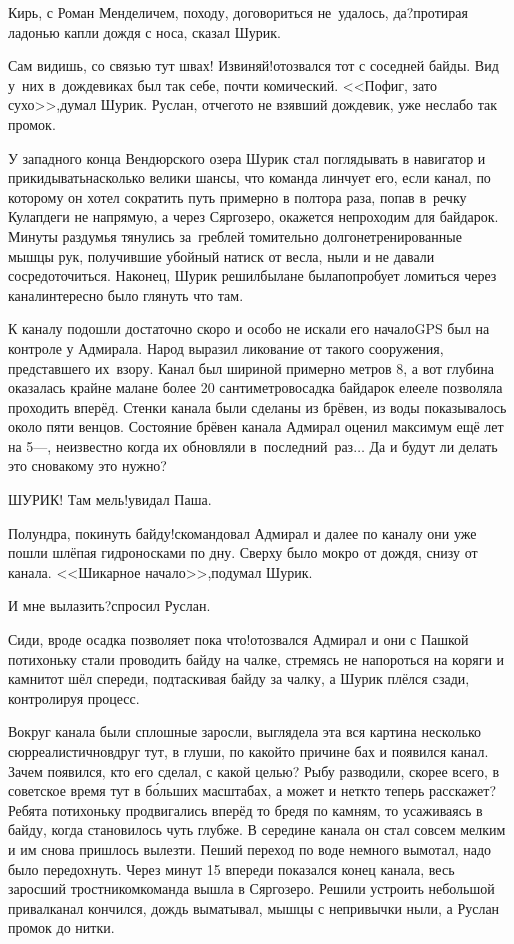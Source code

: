 \diagdash Кирь, с Роман Менделичем, походу, договориться не~удалось, да?\mdash протирая ладонью капли дождя с носа, сказал Шурик.

\diagdash Сам видишь, со связью тут швах! Извиняй!\mdash отозвался тот с соседней байды. Вид у~них в~дождевиках был так себе, почти комический. <<Пофиг, зато сухо>>,\mdash думал Шурик. Руслан, отчего\sdash то не взявший дождевик, уже неслабо так промок.

У западного конца Вендюрского озера Шурик стал поглядывать в навигатор и прикидывать\mdash насколько велики шансы, что команда линчует его, если канал, по которому он хотел сократить путь примерно в полтора раза, попав в~речку Кулапдеги не напрямую, а через Сяргозеро, окажется непроходим для байдарок. Минуты раздумья тянулись за~греблей томительно долго\mdash нетренированные мышцы рук, получившие убойный натиск от весла, ныли и не давали сосредоточиться. Наконец, Шурик решил\mdash была\sdash не была\mdash попробует ломиться через канал\mdash интересно было глянуть что там.

К каналу подошли достаточно скоро и особо не искали его начало\mdash GPS был на контроле у Адмирала. Народ выразил ликование от такого сооружения, представшего их~взору. Канал был шириной примерно метров 8, а вот глубина оказалась крайне мала\mdash не более 20 сантиметров\mdash осадка байдарок еле\sdash еле позволяла проходить вперёд. Стенки канала были сделаны из брёвен, из воды показывалось около пяти венцов. Состояние брёвен канала Адмирал оценил максимум ещё лет на 5\thinspace\nobreakdash---, неизвестно когда их обновляли в~последний~раз$\ldots$ Да и будут ли делать это снова\mdash кому это нужно?

\diagdash ШУРИК! Там мель!\mdash увидал Паша. 

\diagdash Полундра, покинуть байду!\mdash скомандовал Адмирал и далее по каналу они уже пошли шлёпая гидроносками по дну. Сверху было мокро от дождя, снизу от канала. <<Шикарное начало>>,\mdash подумал Шурик.

\diagdash И мне вылазить?\mdash спросил Руслан. 

\diagdash Сиди, вроде осадка позволяет пока что!\mdash отозвался Адмирал и они с Пашкой потихоньку стали проводить байду на чалке, стремясь не напороться на коряги и камни\mdash тот шёл спереди, подтаскивая байду за чалку, а Шурик плёлся сзади, контролируя процесс.

Вокруг канала были сплошные заросли, выглядела эта вся картина несколько сюрреалистично\mdash вдруг тут, в глуши, по какой\sdash то причине бах и появился канал. Зачем появился, кто его сделал, с какой целью? Рыбу разводили, скорее всего, в советское время тут в б\'{о}льших масштабах, а может и нет\mdash кто теперь расскажет? Ребята потихоньку продвигались вперёд то бредя по камням, то усаживаясь в байду, когда становилось чуть глубже. В середине канала он стал совсем мелким и им снова пришлось вылезти. Пеший переход по воде немного вымотал, надо было передохнуть. Через минут 15 впереди показался конец канала, весь заросший тростником\mdash команда вышла в Сяргозеро. Решили устроить небольшой привал\mdash канал кончился, дождь выматывал, мышцы с непривычки ныли, а Руслан промок до нитки.

